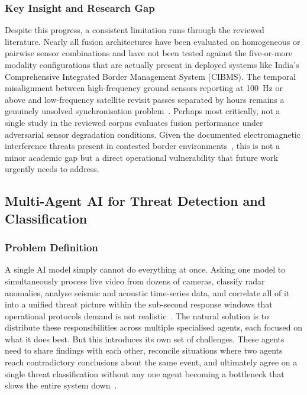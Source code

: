 \subsubsection{Key Insight and Research Gap}
Despite this progress, a consistent limitation runs through the reviewed literature. Nearly all fusion architectures have been evaluated on homogeneous or pairwise sensor combinations and have not been tested against the five-or-more modality configurations that are actually present in deployed systems like India's Comprehensive Integrated Border Management System (CIBMS). The temporal misalignment between high-frequency ground sensors reporting at 100~Hz or above and low-frequency satellite revisit passes separated by hours remains a genuinely unsolved synchronisation problem~\cite{meng2023multisource}. Perhaps most critically, not a single study in the reviewed corpus evaluates fusion performance under adversarial sensor degradation conditions. Given the documented electromagnetic interference threats present in contested border environments~\cite{milai2025risk}, this is not a minor academic gap but a direct operational vulnerability that future work urgently needs to address.


\subsection{Multi-Agent AI for Threat Detection and Classification}
\label{sec:multiagent}

\subsubsection{Problem Definition}
A single AI model simply cannot do everything at once. Asking one model to simultaneously process live video from dozens of cameras, classify radar anomalies, analyse seismic and acoustic time-series data, and correlate all of it into a unified threat picture within the sub-second response windows that operational protocols demand is not realistic~\cite{zhao2022deepai}. The natural solution is to distribute these responsibilities across multiple specialised agents, each focused on what it does best. But this introduces its own set of challenges. These agents need to share findings with each other, reconcile situations where two agents reach contradictory conclusions about the same event, and ultimately agree on a single threat classification without any one agent becoming a bottleneck that slows the entire system down~\cite{hassan2025multiagent}.

